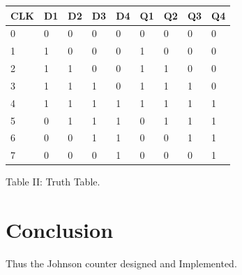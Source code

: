 \documentclass[journal,12pt,twocolumn]{IEEEtran}
\begin{document}
\begin{center}
    
    \setlength{\arrayrulewidth}{0.5mm}
\setlength{\tabcolsep}{18pt}
\renewcommand{\arraystretch}{1.1}
   
\begin{tabular}{|l|l|l|l|l|l|l|l|l|}
\hline
\textbf{CLK} & \textbf{D1} & \textbf{D2} & \textbf{D3} & \textbf{D4} & \textbf{Q1} & \textbf{Q2} & \textbf{Q3} & \textbf{Q4} \\ \hline
0            & 0           & 0           & 0           & 0           & 0           & 0           & 0           & 0           \\ \hline
1            & 1           & 0           & 0           & 0           & 1           & 0           & 0           & 0           \\ \hline
2            & 1           & 1           & 0           & 0           & 1           & 1           & 0           & 0           \\ \hline
3            & 1           & 1           & 1           & 0           & 1           & 1           & 1           & 0           \\ \hline
4            & 1           & 1           & 1           & 1           & 1           & 1           & 1           & 1           \\ \hline
5            & 0           & 1           & 1           & 1           & 0           & 1           & 1           & 1           \\ \hline
6            & 0           & 0           & 1           & 1           & 0           & 0           & 1           & 1           \\ \hline
7            & 0           & 0           & 0           & 1           & 0           & 0           & 0           & 1           \\ \hline
\end{tabular}
   
   \vspace{0.5cm}
   \centering Table II: Truth Table.
\label{table:2}
 \end{center}







 
 \section*{Conclusion}
 Thus the Johnson counter designed and Implemented.
\end{document}
